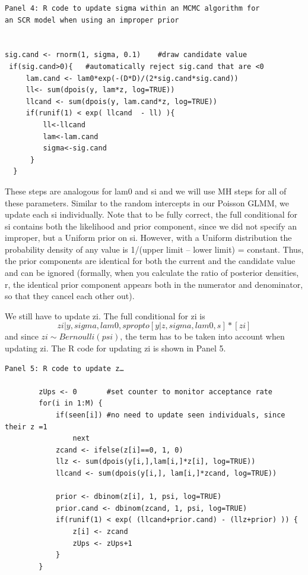 {\small
\begin{verbatim}
Panel 4: R code to update sigma within an MCMC algorithm for 
an SCR model when using an improper prior


sig.cand <- rnorm(1, sigma, 0.1)	#draw candidate value
 if(sig.cand>0){   #automatically reject sig.cand that are <0
     lam.cand <- lam0*exp(-(D*D)/(2*sig.cand*sig.cand))
     ll<- sum(dpois(y, lam*z, log=TRUE))
     llcand <- sum(dpois(y, lam.cand*z, log=TRUE))
     if(runif(1) < exp( llcand  - ll) ){
         ll<-llcand
         lam<-lam.cand
         sigma<-sig.cand
      }
  }

\end{verbatim}
}
These steps are analogous for lam0 and si and we will use MH steps for
all of these parameters. Similar to the random intercepts in our
Poisson GLMM, we update each si individually. Note that to be fully
correct, the full conditional for si contains both the likelihood and
prior component, since we did not specify an improper, but a Uniform
prior on si. However, with a Uniform distribution the probability
density of any value is 1/(upper limit – lower limit) =
constant. Thus, the prior components are identical for both the
current and the candidate value and can be ignored (formally, when you
calculate the ratio of posterior densities, r, the identical prior
component appears both in the numerator and denominator, so that they
cancel each other out). 

We still have to update zi. The full conditional for zi is
\[
zi|y, sigma, lam0, s propto [y|z,sigma, lam0, s] * [zi]
\]
and since $zi \sim Bernoulli(psi)$, 
the term has to be taken into account when updating zi. The R code for updating zi is shown in Panel 5.

{\small
\begin{verbatim}
Panel 5: R code to update z…

        zUps <- 0		#set counter to monitor acceptance rate
        for(i in 1:M) {
            if(seen[i])	#no need to update seen individuals, since their z =1
                next
            zcand <- ifelse(z[i]==0, 1, 0)
            llz <- sum(dpois(y[i,],lam[i,]*z[i], log=TRUE))
            llcand <- sum(dpois(y[i,], lam[i,]*zcand, log=TRUE))

            prior <- dbinom(z[i], 1, psi, log=TRUE)
            prior.cand <- dbinom(zcand, 1, psi, log=TRUE)
            if(runif(1) < exp( (llcand+prior.cand) - (llz+prior) )) {
                z[i] <- zcand
                zUps <- zUps+1
            }
        }
\end{verbatim}
}

